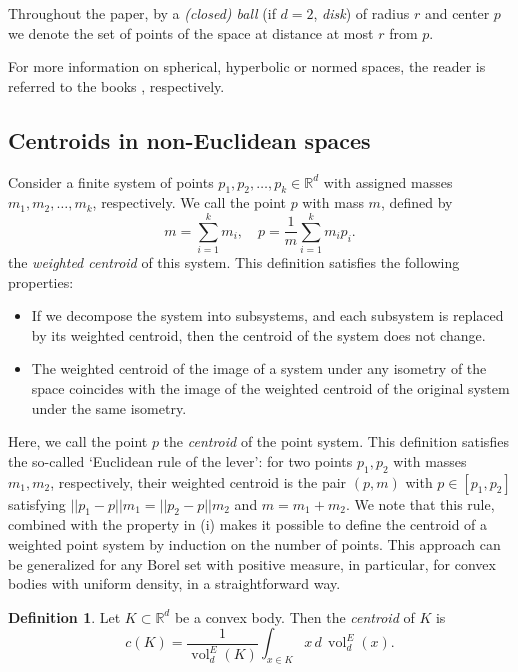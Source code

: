 \documentclass[twoside]{amsart}
\theoremstyle{plain}
\theoremstyle{definition}
\newtheorem{definition}[theorem]{Definition}
\numberwithin{equation}{section}
\renewcommand{\Re}{\mathbb R}
\DeclareMathOperator{\vol}{vol}
\begin{document}
Throughout the paper, by a \emph{(closed) ball} (if $d=2$, \emph{disk}) of radius $r$ and center $p$ we denote the set of points of the space at distance at most $r$ from $p$.

For more information on spherical, hyperbolic or normed spaces, the reader is referred to the books \cite{MM, ratcliffe, thompson}, respectively.


\subsection{Centroids in non-Euclidean spaces}\label{subsec:centroids}

Consider a finite system of points $p_1, p_2, \ldots, p_k \in \Re^d$ with assigned masses $m_1, m_2, \ldots, m_k$, respectively. We call the point $p$ with mass $m$, defined by
\[
m = \sum_{i=1}^k m_i, \quad p= \frac{1}{m} \sum_{i=1}^k m_i p_i.
\]
the \emph{weighted centroid} of this system.
This definition satisfies the following properties:
\begin{itemize}
\item[(i)] If we decompose the system into subsystems, and each subsystem is replaced by its weighted centroid, then the centroid of the system does not change.
\item[(ii)] The weighted centroid of the image of a system under any isometry of the space coincides with the image of the weighted centroid of the original system under the same isometry. 
\end{itemize}
Here, we call the point $p$ the \emph{centroid} of the point system.
This definition satisfies the so-called `Euclidean rule of the lever': for two points $p_1,p_2$ with masses $m_1, m_2$, respectively, their weighted centroid is the pair $(p,m)$ with $p \in [p_1,p_2]$ satisfying $||p_1-p|| m_1 = ||p_2-p|| m_2$ and $m=m_1+m_2$.
We note that this rule, combined with the property in (i) makes it possible to define the centroid of a weighted point system by induction on the number of points.
This approach can be generalized for any Borel set with positive measure, in particular, for convex bodies with uniform density, in a straightforward way.

\begin{definition}\label{defn:centroidRed}
Let $K \subset \Re^d$ be a convex body.
Then the \emph{centroid} of $K$ is
\begin{equation}\label{eq:centroidRed}
c(K) = \frac{1}{\vol_d^E(K)} \int_{x \in K} x \, d \, \vol_d^E(x).
\end{equation}
\end{definition}
\end{document}
